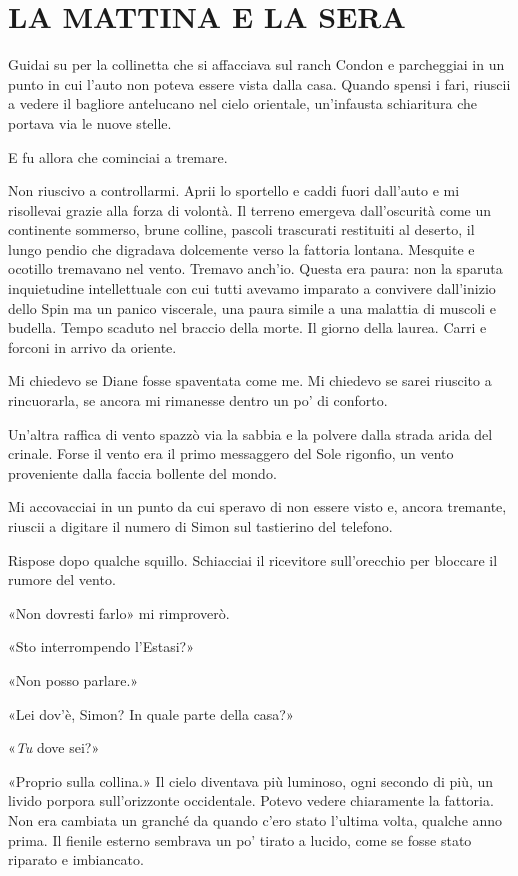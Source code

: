 \chapter{LA MATTINA E LA SERA}\label{la-mattina-e-la-sera}

\hfill\break

Guidai su per la collinetta che si affacciava sul ranch Condon e
parcheggiai in un punto in cui l'auto non poteva essere vista dalla
casa. Quando spensi i fari, riuscii a vedere il bagliore antelucano nel
cielo orientale, un'infausta schiaritura che portava via le nuove
stelle.

E fu allora che cominciai a tremare.

Non riuscivo a controllarmi. Aprii lo sportello e caddi fuori dall'auto
e mi risollevai grazie alla forza di volontà. Il terreno emergeva
dall'oscurità come un continente sommerso, brune colline, pascoli
trascurati restituiti al deserto, il lungo pendio che digradava
dolcemente verso la fattoria lontana. Mesquite e ocotillo tremavano nel
vento. Tremavo anch'io. Questa era paura: non la sparuta inquietudine
intellettuale con cui tutti avevamo imparato a convivere dall'inizio
dello Spin ma un panico viscerale, una paura simile a una malattia di
muscoli e budella. Tempo scaduto nel braccio della morte. Il giorno
della laurea. Carri e forconi in arrivo da oriente.

Mi chiedevo se Diane fosse spaventata come me. Mi chiedevo se sarei
riuscito a rincuorarla, se ancora mi rimanesse dentro un po' di
conforto.

Un'altra raffica di vento spazzò via la sabbia e la polvere dalla strada
arida del crinale. Forse il vento era il primo messaggero del Sole
rigonfio, un vento proveniente dalla faccia bollente del mondo.

Mi accovacciai in un punto da cui speravo di non essere visto e, ancora
tremante, riuscii a digitare il numero di Simon sul tastierino del
telefono.

Rispose dopo qualche squillo. Schiacciai il ricevitore sull'orecchio per
bloccare il rumore del vento.

«Non dovresti farlo» mi rimproverò.

«Sto interrompendo l'Estasi?»

«Non posso parlare.»

«Lei dov'è, Simon? In quale parte della casa?»

«\emph{Tu} dove sei?»

«Proprio sulla collina.» Il cielo diventava più luminoso, ogni secondo
di più, un livido porpora sull'orizzonte occidentale. Potevo vedere
chiaramente la fattoria. Non era cambiata un granché da quando c'ero
stato l'ultima volta, qualche anno prima. Il fienile esterno sembrava un
po' tirato a lucido, come se fosse stato riparato e imbiancato.

